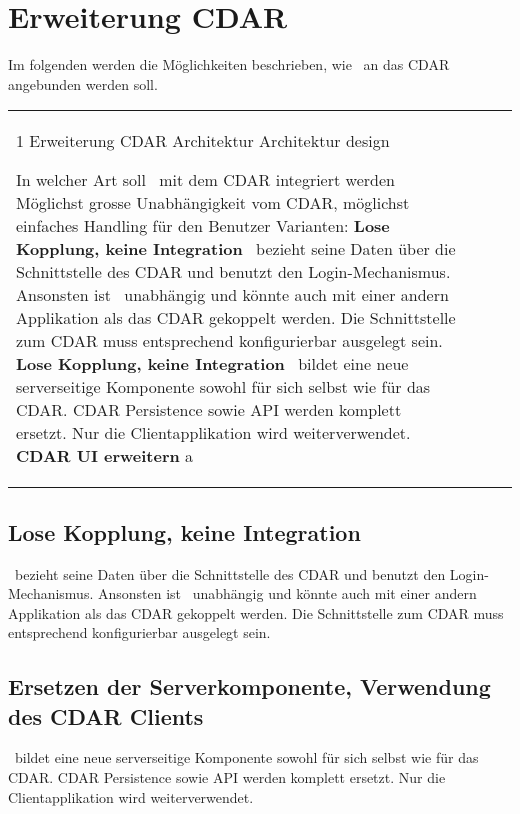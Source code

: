 	\newcommand{\decision}[2]{
		\vspace{0.5cm}
		\noindent
		\begin{tabularx}{\textwidth}{|p{0.2\textwidth}|X|l|l|}
			\hline
			#1
			\hline
			#2
			\hline
		\end{tabularx}
		\vspace{0.5cm}
		\newline	
	}

	\section{Erweiterung CDAR}
		Im folgenden werden die Möglichkeiten beschrieben, wie \eeppi\ an das CDAR angebunden werden soll.
		
		\decision{
			\decisionHeader
			{1}
			{Erweiterung CDAR}
			{Architektur}
			{Architektur design}
		}{
			\decisionContent
			{}
			{In welcher Art soll \eeppi\ mit dem CDAR integriert werden}
			{}
			{Möglichst grosse Unabhängigkeit vom CDAR, möglichst einfaches Handling für den Benutzer}{
				Varianten:\newline
				\textbf{Lose Kopplung, keine Integration} \eeppi\ bezieht seine Daten über die Schnittstelle des CDAR und benutzt den Login-Mechanismus. 
			Ansonsten ist \eeppi\ unabhängig und könnte auch mit einer andern Applikation als das CDAR gekoppelt werden. 
			Die Schnittstelle zum CDAR muss entsprechend konfigurierbar ausgelegt sein. \newline
				\textbf{Lose Kopplung, keine Integration} \eeppi\ bildet eine neue serverseitige Komponente sowohl für sich selbst wie für das CDAR.
			CDAR Persistence sowie API werden komplett ersetzt.
			Nur die Clientapplikation wird weiterverwendet.\newline
				\textbf{CDAR UI erweitern} a
			}
			{}
			{}
			{}
		}
		
		\subsection{Lose Kopplung, keine Integration}
			\eeppi\ bezieht seine Daten über die Schnittstelle des CDAR und benutzt den Login-Mechanismus. 
			Ansonsten ist \eeppi\ unabhängig und könnte auch mit einer andern Applikation als das CDAR gekoppelt werden. 
			Die Schnittstelle zum CDAR muss entsprechend konfigurierbar ausgelegt sein.
			
		\subsection{Ersetzen der Serverkomponente, Verwendung des CDAR Clients}
			\eeppi\ bildet eine neue serverseitige Komponente sowohl für sich selbst wie für das CDAR.
			CDAR Persistence sowie API werden komplett ersetzt.
			Nur die Clientapplikation wird weiterverwendet.
			

